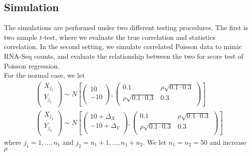 \documentclass[12pt, a4paper]{article}
\begin{document}
	
	
	\subsection{Simulation}
	The simulations are performed under two different testing procedures. The first is two sample
	$t$-test, where we evaluate the true correlation and statistics correlation.  In the second setting,
	we simulate correlated Poisson data to mimic RNA-Seq counts, and evaluate the relationship between
	the two for score test of Poisson regression. \\
	
	For the normal case, we let 
	\begin{equation}
		\begin{aligned}
			&\left( \begin{array}{c}
				X_{j_1}\\
				Y_{j_1}\\
			\end{array}\right)
			\sim N\left[
			\left(\begin{array}{c}
				10\\
				-10\\
			\end{array} \right), 
			\left(
			\begin{array}{cc}
				0.1 &\rho \sqrt{0.1\cdot 0.3} \\
				\rho \sqrt{0.1\cdot 0.3} & 	0.3 \\
			\end{array}
			\right)
			\right] \\
			& \left( \begin{array}{c}
				X_{j_2}\\
				Y_{j_2}\\
			\end{array}\right)
			\sim N\left[
			\left(\begin{array}{c}
				10+ \Delta_X\\
				-10 + \Delta_Y\\
			\end{array} \right), 
			\left(
			\begin{array}{cc}
				0.1 &\rho \sqrt{0.1\cdot 0.3} \\
				\rho \sqrt{0.1\cdot 0.3} & 	0.3 \\
			\end{array}
			\right)
			\right] 
		\end{aligned}
	\end{equation}
	where $j_1 = 1,\ldots, n_1$ and $j_2 = n_1 + 1, \ldots, n_1 + n_2$. We let $n_1= n_2 =50$ and increase $\rho$
\end{document}
